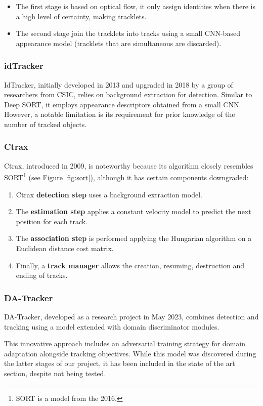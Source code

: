 \begin{itemize}
    \item The first stage is based on optical flow, it only assign identities when there is a high level of certainty, making tracklets.
    \item The second stage join the tracklets into tracks using a small \ac{CNN}-based appearance model (tracklets that are simultaneous are discarded).
\end{itemize}

\subsubsection{idTracker}

{
    IdTracker\cite{IdTracker, IdTracker2}, initially developed in 2013 and upgraded in 2018 by a group of researchers from \ac{CSIC}, relies on background extraction for detection. 
    Similar to Deep SORT, it employs appearance descriptors obtained from a small \ac{CNN}. 
    However, a notable limitation is its requirement for prior knowledge of the number of tracked objects.
}

\subsubsection{Ctrax}

{
    Ctrax\cite{ctrax}, introduced in 2009, is noteworthy because its algorithm closely resembles \ac{SORT}\footnote{SORT is a model from the 2016.} (see Figure \ref{fig:sort}), although it has certain components downgraded:
}

\begin{enumerate}
    \item Ctrax \textbf{detection step} uses a background extraction model.
    \item The \textbf{estimation step} applies a constant velocity model to predict the next position for each track.
    \item The \textbf{association step} is performed applying the Hungarian algorithm on a Euclidean distance cost matrix.
    \item Finally, a \textbf{track manager} allows the creation, resuming, destruction and ending of tracks.
\end{enumerate}

\subsubsection{DA-Tracker}

{
    DA-Tracker\cite{abeysinghe2023tracking}, developed as a research project in May 2023, 
    combines detection and tracking using a model extended with domain discriminator modules. 
}

{
    This innovative approach includes an adversarial training strategy for domain adaptation alongside tracking objectives. 
    While this model was discovered during the latter stages of our project, it has been included in the state of the art section, despite not being tested.
}
